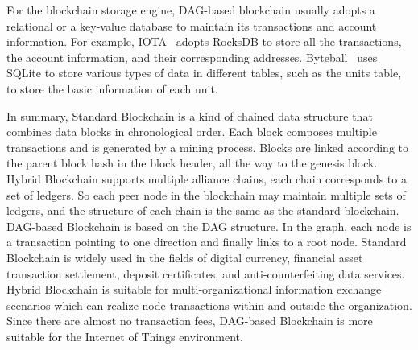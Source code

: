 \documentclass[acmsmall]{acmart}
\begin{document}
For the blockchain storage engine, DAG-based blockchain usually adopts a relational or a key-value database to maintain its transactions and account information. For example, IOTA~\cite{popov2016tangle} adopts RocksDB to store all the transactions, the account information, and their corresponding addresses. Byteball~\cite{churyumov2016byteball} uses SQLite to store various types of data in different tables, such as the units table, to store the basic information of each unit.


In summary, Standard Blockchain is a kind of chained data structure that combines data blocks in chronological order. Each block composes multiple transactions and is generated by a mining process. Blocks are linked according to the parent block hash in the block header, all the way to the genesis block. Hybrid Blockchain supports multiple alliance chains, each chain corresponds to a set of ledgers. So each peer node in the blockchain may maintain multiple sets of ledgers, and the structure of each chain is the same as the standard blockchain. DAG-based Blockchain is based on the DAG structure. In the graph, each node is a transaction pointing to one direction and finally links to a root node. Standard Blockchain is widely used in the fields of digital currency, financial asset transaction settlement, deposit certificates, and anti-counterfeiting data services. Hybrid Blockchain is suitable for multi-organizational information exchange scenarios which can realize node transactions within and outside the organization. Since there are almost no transaction fees, DAG-based Blockchain is more suitable for the Internet of Things environment.


\end{document}
